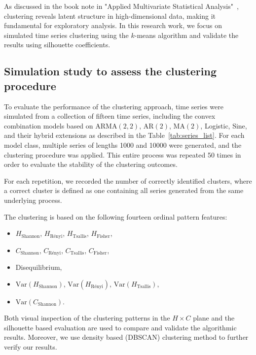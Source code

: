 \documentclass[12pt,a4paper]{article}
\begin{document}
As discussed in the book note in "Applied Multivariate Statistical Analysis"~\cite{HardleSimarFengler2024}, clustering reveals latent structure in high-dimensional data, making it fundamental for exploratory analysis.
In this research work, we focus on simulated time series clustering using the $k$-means algorithm and validate the results using silhouette coefficients.

\subsection{Simulation study to assess the clustering procedure}

To evaluate the performance of the clustering approach, time series were simulated from a collection of fifteen time series, including the convex combination models based on $\mathrm{ARMA}(2,2)$, $\mathrm{AR}(2)$, $\mathrm{MA}(2)$, Logistic, Sine, and their hybrid extensions as described in the Table~\ref{tab:series_list}. 
For each model class, multiple series of lengths 1000 and 10000 were generated, and the clustering procedure was applied. 
This entire process was repeated 50 times in order to evaluate the stability of the clustering outcomes.  

For each repetition, we recorded the number of correctly identified clusters, where a correct cluster is defined as one containing all series generated from the same underlying process. 

The clustering is based on the following fourteen ordinal pattern features:
\begin{itemize}
	\item $H_{\text{Shannon}}$, $H_{\text{Rényi}}$, $H_{\text{Tsallis}}$, $H_{\text{Fisher}}$,
	\item $C_{\text{Shannon}}$, $C_{\text{Rényi}}$, $C_{\text{Tsallis}}$, $C_{\text{Fisher}}$,
	\item Disequilibrium,
	\item $\mathrm{Var}(H_{\text{Shannon}})$, $\mathrm{Var}(H_{\text{Rényi}})$, $\mathrm{Var}(H_{\text{Tsallis}})$, 
	\item $\mathrm{Var}(C_{\text{Shannon}})$.
\end{itemize}

Both visual inspection of the clustering patterns in the $H \times C$ plane and the silhouette based evaluation are used to compare and validate the algorithmic results. Moreover, we use density based (DBSCAN) clustering method to further verify our results. 
\end{document}
